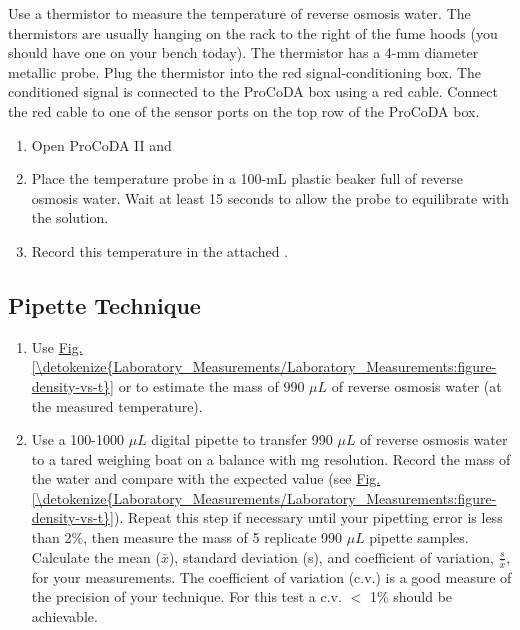 \documentclass[letterpaper,10pt,english]{sphinxmanual}
\begin{document}
Use a thermistor to measure the temperature of reverse osmosis water. The thermistors are usually hanging on the rack to the right of the fume hoods (you should have one on your bench today). The thermistor has a 4-mm diameter metallic probe. Plug the thermistor into the red signal-conditioning box. The conditioned signal is connected to the ProCoDA box using a red cable. Connect the red cable to one of the sensor ports on the top row of the ProCoDA box.
\begin{enumerate}
\item {} 
Open ProCoDA II and {\hyperref[\detokenize{ProCoDA/ProCoDA:heading-procoda-temperature-measurement}]{}}

\item {} 
Place the temperature probe in a 100-mL plastic beaker full of reverse osmosis water. Wait at least 15 seconds to allow the probe to equilibrate with the solution.

\item {} 
Record this temperature in the attached .

\end{enumerate}


\subsection{Pipette Technique}
\label{\detokenize{Laboratory_Measurements/Laboratory_Measurements:pipette-technique}}\begin{enumerate}
\item {} 
Use \hyperref[\detokenize{Laboratory_Measurements/Laboratory_Measurements:figure-density-vs-t}]{Fig.\@ \ref{\detokenize{Laboratory_Measurements/Laboratory_Measurements:figure-density-vs-t}}} or  to estimate the mass of 990 \(\mu L\) of reverse osmosis water (at the measured temperature).

\item {} 
Use a 100-1000 \(\mu L\) digital pipette to transfer 990 \(\mu L\) of reverse osmosis water to a tared weighing boat on a balance with mg resolution. Record the mass of the water and compare with the expected value (see \hyperref[\detokenize{Laboratory_Measurements/Laboratory_Measurements:figure-density-vs-t}]{Fig.\@ \ref{\detokenize{Laboratory_Measurements/Laboratory_Measurements:figure-density-vs-t}}}). Repeat this step if necessary until your pipetting error is less than 2\%, then measure the mass of 5 replicate 990 \(\mu L\) pipette samples. Calculate the mean (\(\bar{x}\)), standard deviation (s), and coefficient of variation, \(\frac{s}{\bar{x}}\), for your measurements. The coefficient of variation (c.v.) is a good measure of the precision of your technique. For this test a c.v. \(\mathrm{<}\) 1\% should be achievable.

\end{enumerate}
\end{document}
